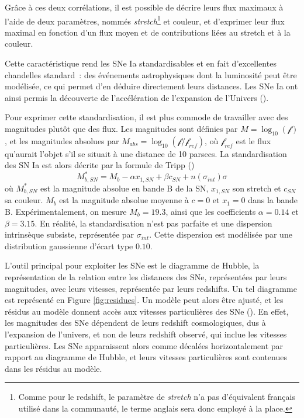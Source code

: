 \documentclass{book}
\let\mcl\mathcal
\begin{document}
Grâce à ces deux corrélations, il est possible de décrire leurs flux maximaux à l'aide de deux paramètres, nommés \textit{stretch}\footnote{Comme pour le redshift, le paramètre de \textit{stretch} n'a pas d'équivalent français utilisé dans la communauté, le terme anglais sera donc employé à la place.} et couleur, et d'exprimer leur flux maximal en fonction d'un flux moyen et de contributions liées au stretch et à la couleur.

Cette caractéristique rend les SNe Ia standardisables et en fait d'excellentes chandelles standard~: des événements astrophysiques dont la luminosité peut être modélisée, ce qui permet d'en déduire directement leurs distances. Les SNe Ia ont ainsi permis la découverte de l'accélération de l'expansion de l'Univers (\cite{perlmutter_cosmology_1998, riess_observational_1998}).

Pour exprimer cette standardisation, il est plus commode de travailler avec des magnitudes plutôt que des flux. Les magnitudes sont définies par $M=\log_{10}(\mcl f)$, et les magnitudes absolues par $M_{abs} = \log_{10}(\mcl f /\mcl f_{ref})$, où $\mcl f_{ref}$ est le flux qu'aurait l'objet s'il se situait à une distance de 10 parsecs. La standardisation des SN Ia est alors décrite par la formule de Tripp (\cite{tripp_two-parameter_1998})
\begin{equation}
\label{eq:tripp}
    M^*_{b,SN} = M_b - \alpha x_{1,SN} + \beta c_{SN} + n(\sigma_{int}) \sigma
\end{equation}
où $M^*_{b,SN}$ est la magnitude absolue en bande B de la SN, $x_{1,SN}$ son stretch et $c_{SN}$ sa couleur. $M_b$ est la magnitude absolue moyenne à $c=0$ et $x_1=0$ dans la bande B. Expérimentalement, on mesure $M_b=19.3$, ainsi que les coefficients $\alpha=0.14$ et $\beta=3.15$. En réalité, la standardisation n'est pas parfaite et une dispersion intrinsèque subsiste, représentée par $\sigma_{int}$. Cette dispersion est modélisée par une distribution gaussienne d'écart type $0.10$.

L'outil principal pour exploiter les SNe est le diagramme de Hubble, la représentation de la relation entre les distances des SNe, représentées par leurs magnitudes, avec leurs vitesses, représentée par leurs redshifts. Un tel diagramme est représenté en Figure \ref{fig:residues}. Un modèle peut alors être ajusté, et les résidus au modèle donnent accès aux vitesses particulières des SNe (\cite{davis_effect_2011}). En effet, les magnitudes des SNe dépendent de leurs redshift cosmologiques, dus à l'expansion de l'univers, et non de leurs redshift observé, qui inclue les vitesses particulières. Les SNe apparaissent alors comme décalées horizontalement par rapport au diagramme de Hubble, et leurs vitesses particulières sont contenues dans les résidus au modèle.
\end{document}
